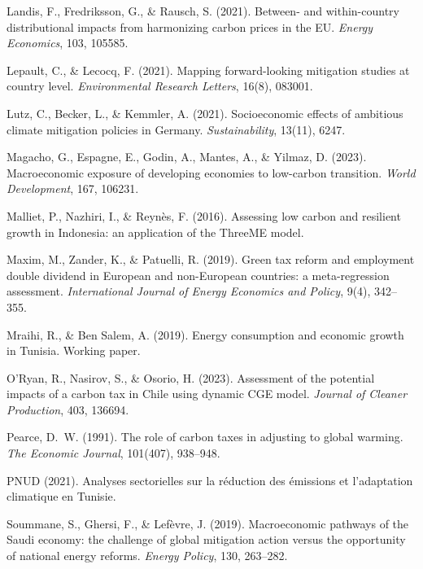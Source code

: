 \documentclass[12pt, a4paper]{article}
\begin{document}
\begin{enumerate}[label={[\arabic*]}, leftmargin=*]
\item Landis, F., Fredriksson, G., \& Rausch, S. (2021). Between- and within-country distributional impacts from harmonizing carbon prices in the EU. \textit{Energy Economics}, 103, 105585.

\item Lepault, C., \& Lecocq, F. (2021). Mapping forward-looking mitigation studies at country level. \textit{Environmental Research Letters}, 16(8), 083001.

\item Lutz, C., Becker, L., \& Kemmler, A. (2021). Socioeconomic effects of ambitious climate mitigation policies in Germany. \textit{Sustainability}, 13(11), 6247.

\item Magacho, G., Espagne, E., Godin, A., Mantes, A., \& Yilmaz, D. (2023). Macroeconomic exposure of developing economies to low-carbon transition. \textit{World Development}, 167, 106231.

\item Malliet, P., Nazhiri, I., \& Reynès, F. (2016). Assessing low carbon and resilient growth in Indonesia: an application of the ThreeME model.

\item Maxim, M., Zander, K., \& Patuelli, R. (2019). Green tax reform and employment double dividend in European and non-European countries: a meta-regression assessment. \textit{International Journal of Energy Economics and Policy}, 9(4), 342--355.

\item Mraihi, R., \& Ben Salem, A. (2019). Energy consumption and economic growth in Tunisia. Working paper.

\item O'Ryan, R., Nasirov, S., \& Osorio, H. (2023). Assessment of the potential impacts of a carbon tax in Chile using dynamic CGE model. \textit{Journal of Cleaner Production}, 403, 136694.

\item Pearce, D.~W. (1991). The role of carbon taxes in adjusting to global warming. \textit{The Economic Journal}, 101(407), 938--948.

\item PNUD (2021). Analyses sectorielles sur la réduction des émissions et l'adaptation climatique en Tunisie.

\item Soummane, S., Ghersi, F., \& Lefèvre, J. (2019). Macroeconomic pathways of the Saudi economy: the challenge of global mitigation action versus the opportunity of national energy reforms. \textit{Energy Policy}, 130, 263--282.


\end{enumerate}
\end{document}
